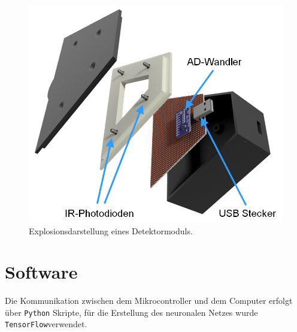 \documentclass{sciposter}
\begin{document}
\begin{multicols}{3}
\begin{figure}[h]
	\centering
	\includegraphics[scale=1.25]{../CAD_Bilder/Detektormodul/Detektormodul_beschriftet.png}
	\caption{Explosionsdarstellung eines Detektormoduls.}
	\label{fig:Detektormodul}
\end{figure}


\section{Software}

\noindent
Die Kommunikation zwischen dem Mikrocontroller und dem Computer erfolgt über \texttt{Python} Skripte, für die Erstellung des neuronalen Netzes wurde \texttt{TensorFlow}\texttrademark verwendet.


\end{multicols}
\end{document}
